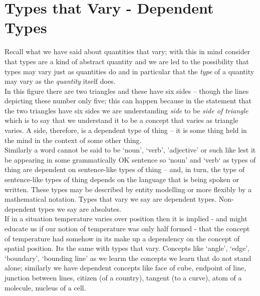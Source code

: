 \documentclass[10pt,a4paper]{article}
\begin{document}
\section{Types that Vary - Dependent Types}
 Recall what we have said about quantities that vary; with this in mind consider that types are a kind of abstract quantity and we are led to the possibility that types
may vary just as quantities do and in particular that the \textit{type} of a quantity may vary as the \textit{quantity} itself  does.  \\

\noindent In this figure
\raisebox{-0.5cm}{
\pspicture(0,-0.1)(1.1,1)
\psline(0,0)(0,1)(1,1)(1,0)(0,0)
\psline (0,0)(1,1)
\endpspicture
}
there are two triangles and these have six sides -- though the lines depicting these number only five; 
this can happen
because in the statement that the two triangles have six sides we are understanding \textit{side}
to be \textit{side of triangle} which is to say that we understand it to be a concept that varies as
triangle varies. A side, therefore, is a dependent type of thing -- it is some thing held in the mind
in the context of some other thing. \\


\noindent
Similarly a word cannot be said to be `noun', `verb', 'adjective' or such like lest it be appearing in some grammatically OK sentence so `noun' and `verb` as types of thing are dependent on sentence-like types of thing 
-- and, in turn, the type of sentence-like types of thing depends on the language that is being spoken or written.
 These types may be described by entity modelling or more flexibly by a mathematical notation. Types
that vary we say are dependent types. Non-dependent types we say are absolutes. \\

\noindent If in a situation temperature varies over position then it is implied - and might educate us if our notion of temperature was only half formed - that the concept of temperature had somehow in its make up a dependency on the concept of spatial position. Its the same with types that vary. 
Concepts like `angle', `edge', `boundary', `bounding line' as we learm the concepts
we learn that do not stand alone; similarly
we have dependent concepts like  face of cube,  endpoint of line,   junction between lines, citizen (of a country), tangent (to a curve), atom of a molecule,  nucleus of a cell. \\
\end{document}
